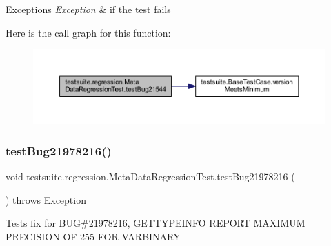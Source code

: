 \begin{DoxyExceptions}{Exceptions}
{\em Exception} & if the test fails \\
\hline
\end{DoxyExceptions}
Here is the call graph for this function\+:
\nopagebreak
\begin{figure}[H]
\begin{center}
\leavevmode
\includegraphics[width=350pt]{classtestsuite_1_1regression_1_1_meta_data_regression_test_ad063a1590627c6505de6ff9a64d90ab8_cgraph}
\end{center}
\end{figure}
\mbox{\label{classtestsuite_1_1regression_1_1_meta_data_regression_test_a375e1a8c67204d8fcbbca1bd9957881d}} 
\subsubsection{\texorpdfstring{test\+Bug21978216()}{testBug21978216()}}
{\footnotesize\ttfamily void testsuite.\+regression.\+Meta\+Data\+Regression\+Test.\+test\+Bug21978216 (\begin{DoxyParamCaption}{ }\end{DoxyParamCaption}) throws Exception}

Tests fix for B\+UG\#21978216, G\+E\+T\+T\+Y\+P\+E\+I\+N\+FO R\+E\+P\+O\+RT M\+A\+X\+I\+M\+UM P\+R\+E\+C\+I\+S\+I\+ON OF 255 F\+OR V\+A\+R\+B\+I\+N\+A\+RY


